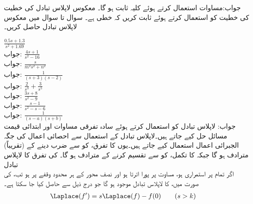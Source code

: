 جواب:مساوات  استعمال کرتے ہوئے کلیہ ثابت ہو گا۔
\quad معکوس لاپلاس تبادل کی خطیت\\
 کی خطیت کو استعمال کرتے ہوئے ثابت کریں کہ  خطی ہے۔
سوال  تا سوال  میں معکوس لاپلاس تبادل حاصل کریں۔

\quad
$\frac{0.5s+1.3}{s^2+1.69}$\\
جواب:
\quad
$\frac{4s+1}{s^2-16}$\\
جواب:
\quad
$\frac{s}{m^2s^2+n^2}$\\
جواب:
\quad
$\frac{1}{(s+3)(s-2)}$\\
جواب:
\quad
$\frac{2}{s^3}+\frac{3}{s^5}$\\
جواب:
\quad
$\frac{3s+8}{s^2-9}$\\
جواب:
\quad
$\frac{s-1}{s^2-s-6}$\\
جواب:
\quad
$\frac{1}{(s-a)(s+b)}$\\
جواب:
لاپلاس تبادل کو استعمال کرتے ہوئے سادہ تفرقی مساوات اور ابتدائی قیمت مسائل حل کیے جاتے ہیں۔لاپلاس تبادل کے استعمال سے  احصائی اعمال کی جگہ الجبرائی اعمال استعمال کیے جاتے ہیں۔یوں  کا تفرق،  کو  سے ضرب دینے کے (تقریباً) مترادف ہو گا جبکہ  کا تکمل،   کو  سے تقسیم کرنے کے مترادف ہو گا۔ 
\quad {} کی تفرق کا لاپلاس تبادل\\
اگر  تمام  پر استمراری ہو، مساوت  پر پورا اترتا ہو اور  نصف محور  کے ہر محدود وقفے پر  ہو تب،  کی صورت میں،  کا لاپلاس تبادل موجود ہو گا جو درج ذیل سے حاصل کیا جا سکتا ہے۔
\begin{align} \label{مساوات_لاپلاس_درجہ_اول_تفرق}
\Laplace(f')&=s\Laplace(f)-f(0)\quad \quad (s>k)
\end{align}


